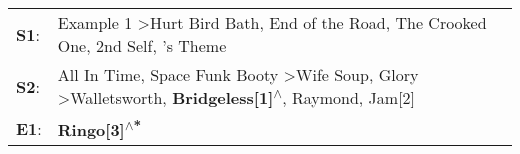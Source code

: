 \begin{supertabular}{p{0.03\textwidth}p{0.92\textwidth}}
 \textbf{S1}:  &                                                                                                 Example 1\textsuperscript{} \textgreater \enspace Hurt Bird Bath\textsuperscript{}, \enspace End of the Road\textsuperscript{}, \enspace The Crooked One\textsuperscript{}, \enspace 2nd Self\textsuperscript{}, 's Theme\textsuperscript{}  \enspace  \\
 \textbf{S2}:  &  All In Time\textsuperscript{}, \enspace Space Funk Booty\textsuperscript{} \textgreater \enspace Wife Soup\textsuperscript{}, \enspace Glory\textsuperscript{} \textgreater \enspace Walletsworth\textsuperscript{}, \enspace \textbf{Bridgeless[1]\textsuperscript{$\wedge$}}, \enspace Raymond\textsuperscript{}, \enspace Jam[2]\textsuperscript{}  \enspace  \\
 \textbf{E1}:  &                                                                                                                                                                                                                                                                                                           \textbf{Ringo[3]\textsuperscript{$\wedge$*}}  \enspace  \\
\end{supertabular}
